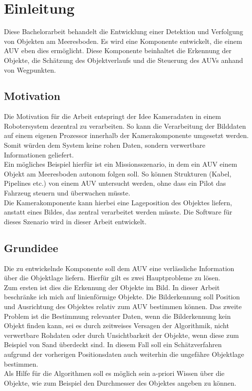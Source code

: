 \section{Einleitung}
Diese Bachelorarbeit behandelt die Entwicklung einer Detektion und Verfolgung von Objekten am Meeresboden. Es wird eine Komponente entwickelt, die einem AUV eben dies ermöglicht. Diese Komponente beinhaltet die Erkennung der Objekte, die Schätzung des Objektverlaufs und die Steuerung des AUVs anhand von Wegpunkten.
\subsection{Motivation}
Die Motivation für die Arbeit entspringt der Idee Kameradaten in einem Robotersystem dezentral zu verarbeiten. So kann die Verarbeitung der Bilddaten auf einem eigenen Prozessor innerhalb der Kamerakomponente umgesetzt werden. Somit würden dem System keine rohen Daten, sondern verwertbare Informationen geliefert.\\
Ein mögliches Beispiel hierfür ist ein Missionsszenario, in dem ein AUV einem Objekt am Meeresboden autonom folgen soll. So können Strukturen (Kabel, Pipelines etc.) von einem AUV untersucht werden, ohne dass ein Pilot das Fahrzeug steuern und überwachen müsste.\\
Die Kamerakomponente kann hierbei eine Lageposition des Objektes liefern, anstatt eines Bildes, das zentral verarbeitet werden müsste. Die Software für dieses Szenario wird in dieser Arbeit entwickelt.\\

\subsection{Grundidee}
Die zu entwickelnde Komponente soll dem AUV eine verlässliche Information über die Objektlage liefern. Hierfür gilt es zwei Hauptprobleme zu lösen.\\
Zum ersten ist dies die Erkennung der Objekte im Bild. In dieser Arbeit beschränke ich mich auf linienförmige Objekte. Die Bilderkennung soll Position und Ausrichtung des Objektes relativ zum AUV bestimmen können.
Das zweite Problem ist die Bestimmung relevanter Daten, wenn die Bilderkennung kein Objekt finden kann, sei es durch zeitweises Versagen der Algorithmik, nicht verwertbare Rohdaten oder durch Unsichtbarkeit der Objekte, wenn diese zum Beispiel von Sand überdeckt sind.
In diesem Fall soll ein Schätzverfahren aufgrund der vorherigen Positionsdaten auch weiterhin die ungefähre Objektlage bestimmen.\\
Als Hilfe für die Algorithmen soll es möglich sein a-priori Wissen über die Objekte, wie zum Beispiel den Durchmesser des Objektes angeben zu können.
